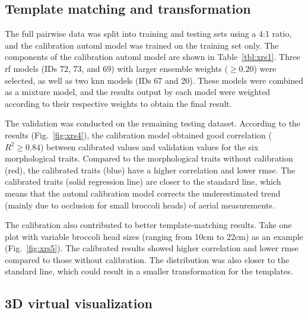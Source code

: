 

\subsection{Template matching and transformation}

The full pairwise data was split into training and testing sets using a 4:1 ratio, and the calibration \gls{automl} model was trained on the training set only. The components of the calibration \gls{automl} model are shown in  Table~\ref{tbl:xrs1}. Three \gls{rf} models (IDs 72, 73, and 69) with larger ensemble weights ($\geq 0.20$) were selected, as well as two \gls{knn} models (IDs 67 and 20). These models were combined as a mixture model, and the results output by each model were weighted according to their respective weights to obtain the final result.



The validation was conducted on the remaining testing dataset. According to the results (Fig.~\ref{fig:xrs4}), the calibration model obtained good correlation ($R^2 \geq 0.84$) between calibrated values and validation values for the six morphological traits. Compared to the morphological traits without calibration (red), the calibrated traits (blue) have a higher correlation and lower \gls{rmse}. The calibrated traits (solid regression line) are closer to the standard line, which means that the \gls{automl} calibration model corrects the underestimated trend (mainly due to occlusion for small broccoli heads) of aerial measurements.



The calibration also contributed to better template-matching results. Take one plot with variable broccoli head sizes (ranging from 10cm to 22cm) as an example (Fig.~\ref{fig:xrs5}). The calibrated results showed higher correlation and lower \gls{rmse} compared to those without calibration. The distribution was also closer to the standard line, which could result in a smaller transformation for the templates.



\subsection{3D virtual visualization}

